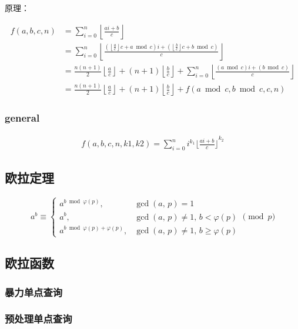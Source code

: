 \documentclass{article}
\begin{document}
原理：

$$
\begin{aligned}
f(a,b,c,n)&=\sum_{i=0}^n\left\lfloor \frac{ai+b}{c} \right\rfloor\\
&=\sum_{i=0}^n\left\lfloor
\frac{\left(\left\lfloor\frac{a}{c}\right\rfloor c+a\bmod c\right)i+\left(\left\lfloor\frac{b}{c}\right\rfloor c+b\bmod c\right)}{c}\right\rfloor\\
&=\frac{n(n+1)}{2}\left\lfloor\frac{a}{c}\right\rfloor+(n+1)\left\lfloor\frac{b}{c}\right\rfloor+
\sum_{i=0}^n\left\lfloor\frac{\left(a\bmod c\right)i+\left(b\bmod c\right)}{c}
\right\rfloor\\
&=\frac{n(n+1)}{2}\left\lfloor\frac{a}{c}\right\rfloor
+(n+1)\left\lfloor\frac{b}{c}\right\rfloor+f(a\bmod c,b\bmod c,c,n)
\end{aligned}
$$

\subsubsection{general}
$$
\begin{aligned}
f(a,b,c,n,k1,k2)=\sum_{i=0}^{n}i^{k_1}{\lfloor \frac{ai+b}{c} \rfloor}^{k_2}
\end{aligned}
$$

\subsection{欧拉定理}

$$
a^b\equiv
\begin{cases}
a^{b\bmod\varphi(p)},\,&\gcd(a,\,p)=1\\
a^b,&\gcd(a,\,p)\ne1,\,b<\varphi(p)\\
a^{b\bmod\varphi(p)+\varphi(p)},&\gcd(a,\,p)\ne1,\,b\ge\varphi(p)
\end{cases}
\pmod p
$$

\subsection{欧拉函数}
\subsubsection{暴力单点查询}

\subsubsection{预处理单点查询}

\end{document}
